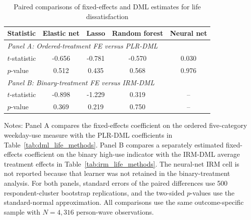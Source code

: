 \begin{table}[!htbp]
\centering
\caption{Paired comparisons of fixed-effects and DML estimates for life dissatisfaction}
\label{tab:fe_dml_comparison}
\small
\setlength{\tabcolsep}{6pt}
\begin{tabular}{lcccc}
\hline
Statistic & Elastic net & Lasso & Random forest & Neural net
\\
\hline
\multicolumn{5}{l}{\textit{Panel A: Ordered-treatment FE versus PLR-DML}} \\
$t$-statistic & -0.656 & -0.781 & -0.570 & 0.030
\\
$p$-value & 0.512 & 0.435 & 0.568 & 0.976
\\[0.4ex]
\multicolumn{5}{l}{\textit{Panel B: Binary-treatment FE versus IRM-DML}} \\
$t$-statistic & -0.898 & -1.229 & 0.319 & --
\\
$p$-value & 0.369 & 0.219 & 0.750 & --
\\
\hline
\end{tabular}
\begin{minipage}{0.96\textwidth}
\footnotesize Notes: Panel A compares the fixed-effects coefficient on the ordered five-category weekday-use measure with the PLR-DML coefficients in Table~\ref{tab:dml_life_methods}. Panel B compares a separately estimated fixed-effects coefficient on the binary high-use indicator with the IRM-DML average treatment effects in Table~\ref{tab:irm_life_methods}. The neural-net IRM cell is not reported because that learner was not retained in the binary-treatment analysis. For both panels, standard errors of the paired differences use 500 respondent-cluster bootstrap replications, and the two-sided $p$-values use the standard-normal approximation. All comparisons use the same outcome-specific sample with $N=4,316$ person-wave observations.
\end{minipage}
\end{table}

